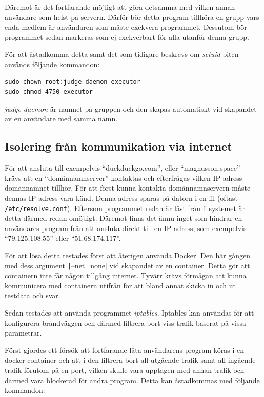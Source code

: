 \documentclass{article}
\begin{document}
Däremot är det fortfarande möjligt att göra detsamma med vilken annan användare
som helst på servern. Därför bör detta program tillhöra en grupp vars enda
medlem är användaren som måste exekvera programmet. Dessutom bör programmet
sedan markeras som ej exekverbart för alla utanför denna grupp.

För att åstadkomma detta samt det som tidigare beskrevs om \textit{setuid}-biten
används följande kommandon:

\begin{verbatim}
sudo chown root:judge-daemon executor
sudo chmod 4750 executor
\end{verbatim}

\textit{judge-daemon} är namnet på gruppen och den skapas automatiskt vid
skapandet av en användare med samma namn.

\subsection{Isolering från kommunikation via internet}

För att ansluta till exempelvis ``duckduckgo.com'', eller ``magnusson.space'' \\
krävs att en ``domännamnserver'' kontaktas och efterfrågas vilken IP-adress
domännamnet tillhör. För att först kunna kontakta domännamnservern måste dennas
IP-adress vara känd. Denna adress sparas på datorn i en fil (oftast
\texttt{/etc/resolve.conf}).  Eftersom programmet redan är låst från filsystemet
är detta därmed redan omöjligt. Däremot finns det ännu inget som hindrar en
användares program från att ansluta direkt till en IP-adress, som exempelvis
``79.125.108.55'' eller ``51.68.174.117''.

För att lösa detta testades först att återigen använda Docker. Den här gången
med dess argument \texttt|--net=none| vid skapandet av
en container. Detta gör att containern inte får någon tillgång internet. Tyvärr
krävs förmågan att kunna kommunicera med containern utifrån för att bland annat
skicka in och ut testdata och svar.

Sedan testades att använda programmet \textit{iptables}. Iptables kan användas
för att konfigurera brandväggen och därmed filtrera bort viss trafik baserat på
vissa parametrar.

Först gjordes ett försök att fortfarande låta användarens program köras i en
docker-container och att i den filtrera bort all utgående trafik samt all
ingående trafik förutom på en port, vilken skulle vara upptagen med annan
trafik och därmed vara blockerad för andra program. Detta kan åstadkommas med
följande kommandon:
\end{document}
